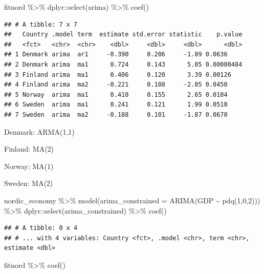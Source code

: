 \documentclass[
]{book}
\newenvironment{Shaded}{\begin{snugshade}}{\end{snugshade}}
\newcommand{\AttributeTok}[1]{\textcolor[rgb]{0.77,0.63,0.00}{#1}}
\newcommand{\DecValTok}[1]{\textcolor[rgb]{0.00,0.00,0.81}{#1}}
\newcommand{\FunctionTok}[1]{\textcolor[rgb]{0.00,0.00,0.00}{#1}}
\newcommand{\NormalTok}[1]{#1}
\newcommand{\SpecialCharTok}[1]{\textcolor[rgb]{0.00,0.00,0.00}{#1}}
\begin{document}
\begin{Shaded}
\begin{Highlighting}[]
\NormalTok{fitnord }\SpecialCharTok{\%\textgreater{}\%}
\NormalTok{  dplyr}\SpecialCharTok{::}\FunctionTok{select}\NormalTok{(arima) }\SpecialCharTok{\%\textgreater{}\%}
  \FunctionTok{coef}\NormalTok{()}
\end{Highlighting}
\end{Shaded}

\begin{verbatim}
## # A tibble: 7 x 7
##   Country .model term  estimate std.error statistic    p.value
##   <fct>   <chr>  <chr>    <dbl>     <dbl>     <dbl>      <dbl>
## 1 Denmark arima  ar1     -0.390     0.206     -1.89 0.0636    
## 2 Denmark arima  ma1      0.724     0.143      5.05 0.00000484
## 3 Finland arima  ma1      0.406     0.120      3.39 0.00126   
## 4 Finland arima  ma2     -0.221     0.108     -2.05 0.0450    
## 5 Norway  arima  ma1      0.410     0.155      2.65 0.0104    
## 6 Sweden  arima  ma1      0.241     0.121      1.99 0.0510    
## 7 Sweden  arima  ma2     -0.188     0.101     -1.87 0.0670
\end{verbatim}

Denmark: ARMA(1,1)

Finland: MA(2)

Norway: MA(1)

Sweden: MA(2)

\begin{Shaded}
\begin{Highlighting}[]
\NormalTok{nordic\_economy }\SpecialCharTok{\%\textgreater{}\%}
  \FunctionTok{model}\NormalTok{(}\AttributeTok{arima\_constrained =} \FunctionTok{ARIMA}\NormalTok{(GDP }\SpecialCharTok{\textasciitilde{}} \FunctionTok{pdq}\NormalTok{(}\DecValTok{1}\NormalTok{,}\DecValTok{0}\NormalTok{,}\DecValTok{2}\NormalTok{))) }\SpecialCharTok{\%\textgreater{}\%}\NormalTok{ dplyr}\SpecialCharTok{::}\FunctionTok{select}\NormalTok{(arima\_constrained) }\SpecialCharTok{\%\textgreater{}\%} \FunctionTok{coef}\NormalTok{()}
\end{Highlighting}
\end{Shaded}

\begin{verbatim}
## # A tibble: 0 x 4
## # ... with 4 variables: Country <fct>, .model <chr>, term <chr>, estimate <dbl>
\end{verbatim}

\begin{Shaded}
\begin{Highlighting}[]
\NormalTok{fitnord }\SpecialCharTok{\%\textgreater{}\%} \FunctionTok{coef}\NormalTok{()}
\end{Highlighting}
\end{Shaded}
\end{document}
